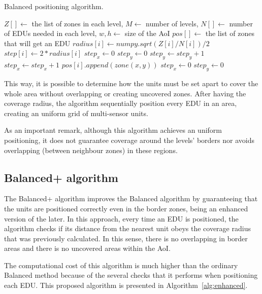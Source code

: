 \begin{refsection}
\begin{algorithm}[ht!]
  \caption{Balanced positioning algorithm.}\label{alg:balanced}
  \begin{algorithmic}
    \REQUIRE $Z[] \gets$ the list of zones in each level, $M \gets$ number of levels, $N[] \gets$ number of EDUs needed in each level, $w, h \gets$ size of the AoI
    \ENSURE $pos[] \gets$ the list of zones that will get an EDU
      \STATE $radius[i] \gets numpy.sqrt(Z[i] / N[i]) / 2$
      \STATE $step[i] \gets 2 * radius[i]$
    \ENDFOR
    \STATE $step_x \gets 0$
    \STATE $step_y \gets 0$
      \STATE $step_y \gets step_y + 1$
        \STATE $step_x \gets step_x + 1$
            \STATE $pos[i].append(zone(x, y))$
            \STATE $step_x \gets 0$
            \STATE $step_y \gets 0$
          \ENDIF
        \ENDFOR
      \ENDFOR
    \ENDFOR
  \end{algorithmic}
\end{algorithm}

This way, it is possible to determine how the units must be set apart to cover the whole area without overlapping or creating uncovered zones. After having the coverage radius, the algorithm sequentially position every EDU in an area, creating an uniform grid of multi-sensor units.

As an important remark, although this algorithm achieves an uniform positioning, it does not guarantee coverage around the levels' borders nor avoids overlapping (between neighbour zones) in these regions.

\subsection {Balanced+ algorithm}

The Balanced+ algorithm improves the Balanced algorithm by guaranteeing that the units are positioned correctly even in the border zones, being an enhanced version of the later. In this approach, every time an EDU is positioned, the algorithm checks if its distance from the nearest unit obeys the coverage radius that was previously calculated. In this sense, there is no overlapping in border areas and there is no uncovered areas within the AoI.

The computational cost of this algorithm is much higher than the ordinary Balanced method because of the several checks that it performs when positioning each EDU. This proposed algorithm is presented in Algorithm~\ref{alg:enhanced}.


\end{refsection}
